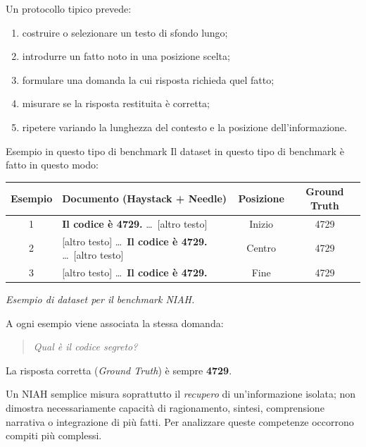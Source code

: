 Un protocollo tipico prevede:
\begin{enumerate}
\item costruire o selezionare un testo di sfondo lungo;
\item introdurre un fatto noto in una posizione scelta;
\item formulare una domanda la cui risposta richieda quel fatto;
\item misurare se la risposta restituita è corretta;
\item ripetere variando la lunghezza del contesto e la posizione dell'informazione.
\end{enumerate}

\begin{example}{Esempio in questo tipo di benchmark}
Il dataset in questo tipo di benchmark è fatto in questo modo:

\begin{center}
    \centering
    \small
    \begin{tabular}{|c|p{7cm}|c|c|}
        \hline
        \textbf{Esempio} &
        \textbf{Documento (Haystack + Needle)} &
        \textbf{Posizione} &
        \textbf{Ground Truth} \\
        \hline

        1 &
        \textbf{Il codice è 4729.} \ldots\
        [altro testo] &
        Inizio & 4729 \\
        \hline

        2 &
        [altro testo] \ldots\
        \textbf{Il codice è 4729.} \ldots\
        [altro testo] &
        Centro & 4729 \\
        \hline

        3 &
        [altro testo] \ldots\
        \textbf{Il codice è 4729.} &
        Fine & 4729 \\
        \hline
    \end{tabular}
\end{center}
\noindent\textit{Esempio di dataset per il benchmark NIAH.}

A ogni esempio viene associata la stessa domanda:
\begin{quote}
    \emph{Qual è il codice segreto?}
\end{quote}

La risposta corretta (\emph{Ground Truth})
è sempre \textbf{4729}.

\end{example}

Un NIAH semplice misura soprattutto il \emph{recupero} di un'informazione isolata; non dimostra necessariamente capacità di ragionamento, sintesi, comprensione narrativa o integrazione di più fatti. Per analizzare queste competenze occorrono compiti più complessi.

